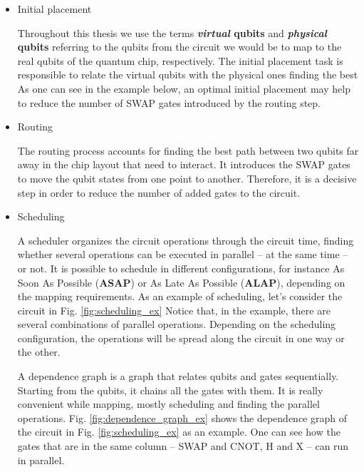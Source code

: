 \begin{itemize}
\item Initial placement
\label{sec:orgf3d2794}

Throughout this thesis we use the terms \textbf{\emph{virtual} qubits} and \textbf{\emph{physical} qubits} referring to the qubits from the circuit we would be to map to the real qubits of the quantum chip, respectively.
The initial placement task is responsible to relate the virtual qubits with the physical ones finding the best 
As one can see in the example below, an optimal initial placement may help to reduce the number of SWAP gates introduced by the routing step.

\item Routing
\label{sec:org1ce1764}

The routing process accounts for finding the best path between two qubits far away in the chip layout that need to interact.
It introduces the SWAP gates to move the qubit states from one point to another.
Therefore, it is a decisive step in order to reduce the number of added gates to the circuit.

\item Scheduling
\label{sec:org28ca89b}

A scheduler organizes the circuit operations through the circuit time,
finding whether several operations can be executed in parallel -- at the same time -- or not.
It is possible to schedule in different configurations, for instance As Soon As Possible (\textbf{ASAP}) or As Late As Possible (\textbf{ALAP}), depending on the mapping requirements.
As an example of scheduling, let's consider the circuit in Fig. \ref{fig:scheduling_ex}
Notice that, in the example, there are several combinations of parallel operations.
Depending on the scheduling configuration,
the operations will be spread along the circuit in one way or the other.

A dependence graph is a graph that relates qubits and gates sequentially.
Starting from the qubits, it chains all the gates with them.
It is really convenient while mapping, mostly scheduling and finding the parallel operations.
Fig. \ref{fig:dependence_graph_ex} shows the dependence graph of the circuit in Fig. \ref{fig:scheduling_ex} as an example.
One can see how the gates that are in the same column -- SWAP and CNOT, H and X -- can run in parallel.
\end{itemize}


